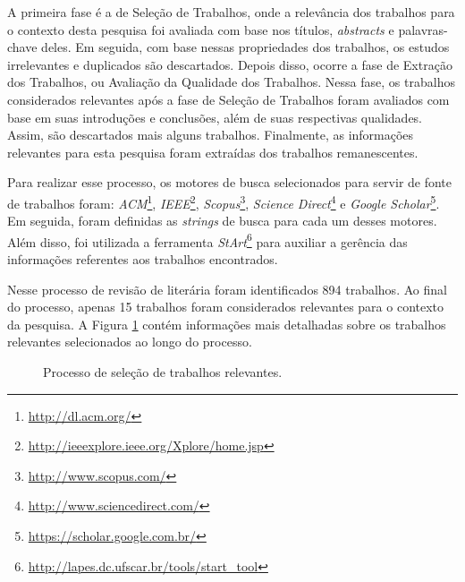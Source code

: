 A primeira fase é a de Seleção de Trabalhos, onde a relevância dos trabalhos para o contexto desta pesquisa foi avaliada com base nos títulos, \textit{abstracts} e palavras-chave deles. Em seguida, com base nessas propriedades dos trabalhos, os estudos irrelevantes e duplicados são descartados. Depois disso, ocorre a fase de Extração dos Trabalhos, ou Avaliação da Qualidade dos Trabalhos. Nessa fase, os trabalhos considerados relevantes após a fase de Seleção de Trabalhos foram avaliados com base em suas introduções e conclusões, além de suas respectivas qualidades. Assim, são descartados mais alguns trabalhos. Finalmente, as informações relevantes para esta pesquisa foram extraídas dos trabalhos remanescentes.

Para realizar esse processo, os motores de busca selecionados para servir de fonte de trabalhos foram: \textit{ACM}\footnote{\url{http://dl.acm.org/}}, \textit{IEEE}\footnote{\url{http://ieeexplore.ieee.org/Xplore/home.jsp}}, \textit{Scopus}\footnote{\url{http://www.scopus.com/}}, \textit{Science Direct}\footnote{\url{http://www.sciencedirect.com/}} e \textit{Google Scholar}\footnote{\url{https://scholar.google.com.br/}}. Em seguida, foram definidas as \textit{strings} de busca para cada um desses motores. Além disso, foi utilizada a ferramenta \textit{StArt}\footnote{\url{http://lapes.dc.ufscar.br/tools/start_tool}} para auxiliar a gerência das informações referentes aos trabalhos encontrados.

Nesse processo de revisão de literária foram identificados 894 trabalhos. Ao final do processo, apenas 15 trabalhos foram considerados relevantes para o contexto da pesquisa. A Figura \ref{fundamentacao:ageis:fatores:revisao} contém informações mais detalhadas sobre os trabalhos relevantes selecionados ao longo do processo.

\begin{figure}[H]
\begin{center}
    \end{center}
    \caption{Processo de seleção de trabalhos relevantes.}
    \label{fundamentacao:ageis:fatores:revisao}
\end{figure}

